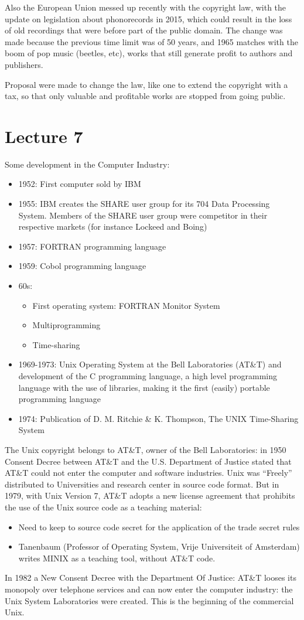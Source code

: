 \documentclass[a4paper, 10pt, titlepage]{article}
\begin{document}
Also the European Union messed up recently with the copyright law, with the update on legislation about phonorecords in 2015, which could result in the loss of old recordings that were before part of the public domain. The change was made because the previous time limit was of 50 years, and 1965 matches with the boom of pop music (beetles, etc), works that still generate profit to authors and publishers. 

Proposal were made to change the law, like one to extend the copyright with a tax, so that only valuable and profitable works are stopped from going public.

\section{Lecture 7}
Some development in the Computer Industry:
\begin{itemize}
\item 1952: First computer sold by IBM
\item 1955: IBM creates the SHARE user group for its 704 Data Processing System. Members of the SHARE user group were competitor in their respective markets (for instance Lockeed and Boing)
\item 1957: FORTRAN programming language
\item 1959: Cobol programming language
\item 60s:
	\begin{itemize}
	\item First operating system: FORTRAN Monitor System
	\item Multiprogramming
	\item Time-sharing
	\end{itemize}
\item 1969-1973: Unix Operating System at the Bell Laboratories (AT\&T) and development of the C programming language, a high level programming language with the use of libraries, making it the first (easily) portable programming language
\item 1974: Publication of D. M. Ritchie \& K. Thompson, The UNIX Time-Sharing System
\end{itemize}
The Unix copyright belongs to AT\&T, owner of the Bell Laboratories: in 1950 Consent Decree between AT\&T and the U.S. Department of Justice stated that AT\&T could not enter the computer and software industries. Unix was “Freely” distributed to Universities and research center in source code format. But in 1979, with Unix Version 7, AT\&T adopts a new license agreement that prohibits the use of the Unix source code as a teaching material:
\begin{itemize}
\item Need to keep to source code secret for the application of the trade secret rules
\item Tanenbaum (Professor of Operating System, Vrije Universiteit of Amsterdam) writes MINIX as a teaching tool, without AT\&T code.
\end{itemize}
In 1982 a New Consent Decree with the Department Of Justice: AT\&T looses its monopoly over telephone services and can now enter the computer industry: the Unix System Laboratories were created. This is the beginning of the commercial Unix.
\end{document}
